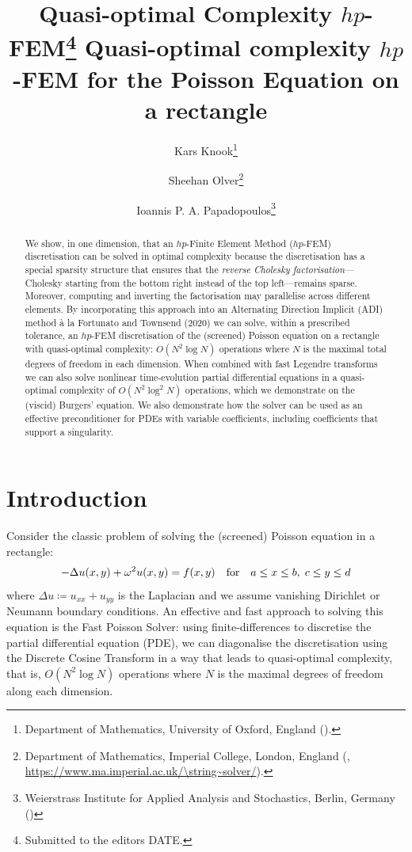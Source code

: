 \documentclass[hidelinks,onefignum,onetabnum]{siamart220329}
\title{Quasi-optimal Complexity $hp$-FEM\thanks{Submitted to the editors DATE.
\funding{This work was funded by the Fog Research Institute under contract no.~FRI-454.}}}
\author{Kars Knook\thanks{Department of Mathematics, University of Oxford, England
  (\email{kars.knook@maths.ox.ac.uk}).}
\and Sheehan Olver\thanks{Department of Mathematics, Imperial College, London, England
  (\email{s.olver@imperial.ac.uk}, \url{https://www.ma.imperial.ac.uk/\string~solver/}).}
\and Ioannis P. A. Papadopoulos\thanks{Weierstrass Institute for Applied Analysis and Stochastics, Berlin, Germany (\email{papadopoulos@wias-berlin.de})  }}
\title{ Quasi-optimal complexity {$hp$}-FEM for the Poisson Equation on a rectangle }
\def\qfor{\quad\hbox{for}\quad}
\begin{document}
\maketitle


\begin{abstract}
We show, in one dimension, that an $hp$-Finite Element Method ($hp$-FEM) discretisation can be  solved in optimal complexity because the discretisation has a special sparsity structure that ensures that the \emph{reverse Cholesky factorisation}---Cholesky starting from the bottom right instead of the top left---remains sparse. Moreover, computing and inverting the factorisation  { may } parallelise across different elements. By incorporating this approach into an Alternating Direction Implicit (ADI) method à la Fortunato and Townsend (2020) we can solve, within a prescribed tolerance, an $hp$-FEM discretisation of the (screened) Poisson equation on a rectangle with quasi-optimal complexity: $O(N^2 \log N)$ operations where $N$ is the maximal total degrees of freedom in each dimension. When combined with fast Legendre transforms we can also solve
nonlinear time-evolution partial differential equations in a quasi-optimal complexity of $O(N^2 \log^2 N)$ operations, which we demonstrate on the (viscid) Burgers' equation. { We also demonstrate how the solver can be used as an effective preconditioner for PDEs with variable coefficients, including coefficients that support a singularity.}
\end{abstract}

\section{Introduction}
Consider the classic problem of solving the (screened) Poisson equation in a rectangle:
\begin{align}
-\Delta u(x,y) + \omega^2 u(x,y) = f(x,y) \qfor a \leq x \leq b, \;  c \leq y \leq d
\label{eq:poisson}
\end{align}
where $\Delta u  \coloneqq u_{xx} + u_{yy}$ is the Laplacian and we assume vanishing Dirichlet or Neumann boundary conditions. An effective and fast approach to solving this equation is the Fast Poisson Solver: using finite-differences to discretise the partial differential equation (PDE), we can diagonalise the discretisation using the Discrete Cosine Transform in a way that leads to quasi-optimal complexity, that is, $O(N^2 \log N)$ operations where $N$ is the maximal degrees of freedom along each dimension. 
\end{document}
